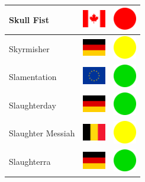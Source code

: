 \documentclass[12pt, a4paper, twoside]{report}
\begin{document}
\begin{center}
\begin{longtable}{|p{5cm}|p{2cm}|p{2cm}|}
 Skull Fist                                                 & \includegraphics[width=1cm]{../img/flags/ca} &   \includegraphics[width=1cm]{../likes/n} \\ \hline
 Skyrmisher                                                 & \includegraphics[width=1cm]{../img/flags/de} &   \includegraphics[width=1cm]{../likes/m} \\ \hline
 Slamentation                                               & \includegraphics[width=1cm]{../img/flags/eu} &   \includegraphics[width=1cm]{../likes/y} \\ \hline
 Slaughterday                                               & \includegraphics[width=1cm]{../img/flags/de} &   \includegraphics[width=1cm]{../likes/y} \\ \hline
 Slaughter Messiah                                          & \includegraphics[width=1cm]{../img/flags/be} &   \includegraphics[width=1cm]{../likes/m} \\ \hline
 Slaughterra                                                & \includegraphics[width=1cm]{../img/flags/de} &   \includegraphics[width=1cm]{../likes/y} \\ \hline

\end{longtable}
\end{center}
\end{document}
